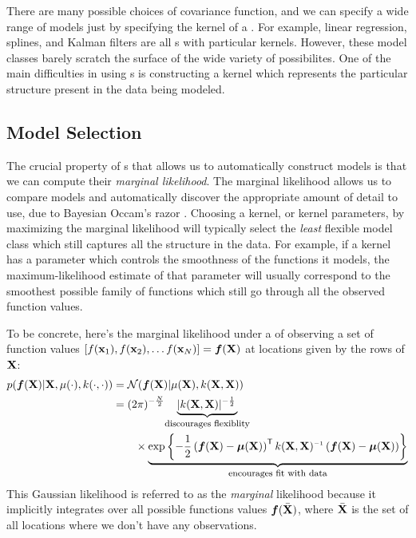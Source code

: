 There are many possible choices of covariance function, and we can specify a wide range of models just by specifying the kernel of a \gp{}.
For example, 
linear regression, splines, 
and Kalman filters are all \gp{}s with particular kernels.
However, these model classes barely scratch the surface of the wide variety of possibilites.
%
One of the main difficulties in using \gp{}s is constructing a kernel which represents the particular structure present in the data being modeled.


\subsection{Model Selection}

The crucial property of \gp{}s that allows us to automatically construct models is that we can compute their \emph{marginal likelihood}.
The marginal likelihood allows us to compare models and automatically discover the appropriate amount of detail to use, due to Bayesian Occam's razor \citep{rasmussen2001occam,mackay2003information}.
Choosing a kernel, or kernel parameters, by maximizing the marginal likelihood will typically select the \emph{least} flexible model class which still captures all the structure in the data.
For example, if a kernel has a parameter which controls the smoothness of the functions it models, the maximum-likelihood estimate of that parameter will usually correspond to the smoothest possible family of functions which still go through all the observed function values.

To be concrete, here's the marginal likelihood under a \gp{} of observing a set of function values $\left[ f({\bf{x}}_1), f({\bf{x}}_2), \ldots f({\bf{x}}_N)  \right] = \boldsymbol{f}(\mathbf{X})$ at locations given by the rows of $\mathbf{X}$:
%
\begin{align}
p(\funcval | \vX, \mu(\cdot), k(\cdot, \cdot)) & = \N{\funcval}{\mu(\vX)}{k(\vX, \vX)} \nonumber\\
& = (2\pi)^{-\frac{N}{2}} \underwrite{ |k(\vX, \vX)|^{-\frac{1}{2}}\,}{\footnotesize discourages flexiblity} \nonumber \\
& \qquad \times \underwrite{\exp \left\{ -\frac{1}{2} \left( \funcval - \boldsymbol\mu(\vX) \right)\tra k(\vX, \vX)\inv \left(\funcval - \boldsymbol\mu(\vX) \right) \right\}}{\footnotesize encourages fit with data}
\label{eq:gp_marg_lik}
\end{align}
%
This Gaussian likelihood is referred to as the \emph{marginal} likelihood because it implicitly integrates over all possible functions values $\boldsymbol{f}( \bar {\mathbf{X}})$, where $\bar {\mathbf{X}}$ is the set of all locations where we don't have any observations.

